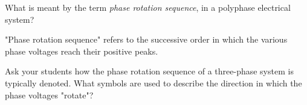 

What is meant by the term {\it phase rotation sequence}, in a polyphase electrical system?







"Phase rotation sequence" refers to the successive order in which the various phase voltages reach their positive peaks.







Ask your students how the phase rotation sequence of a three-phase system is typically denoted.  What symbols are used to describe the direction in which the phase voltages "rotate"?




